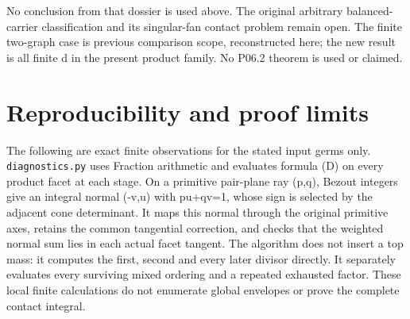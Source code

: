 \documentclass[
  11pt,
]{article}
\newenvironment{Shaded}{}{}
\newcommand{\ExtensionTok}[1]{#1}
\newcommand{\KeywordTok}[1]{\textcolor[rgb]{0.00,0.44,0.13}{\textbf{#1}}}
\newcommand{\NormalTok}[1]{#1}
\newcommand{\SpecialCharTok}[1]{\textcolor[rgb]{0.25,0.44,0.63}{#1}}
\newcommand{\SpecialStringTok}[1]{\textcolor[rgb]{0.73,0.40,0.53}{#1}}
\begin{document}
\begin{Shaded}
\end{Shaded}

No conclusion from that dossier is used above. The original arbitrary
balanced-carrier classification and its singular-fan contact problem
remain open. The finite two-graph case is previous comparison scope,
reconstructed here; the new result is all finite d in the present
product family. No P06.2 theorem is used or claimed.

\section{Reproducibility and proof
limits}\label{reproducibility-and-proof-limits}

The following are exact finite observations for the stated input germs
only. \texttt{diagnostics.py} uses Fraction arithmetic and evaluates
formula (D) on every product facet at each stage. On a primitive
pair-plane ray (p,q), Bezout integers give an integral normal (-v,u)
with pu+qv=1, whose sign is selected by the adjacent cone determinant.
It maps this normal through the original primitive axes, retains the
common tangential correction, and checks that the weighted normal sum
lies in each actual facet tangent. The algorithm does not insert a top
mass: it computes the first, second and every later divisor directly. It
separately evaluates every surviving mixed ordering and a repeated
exhausted factor. These local finite calculations do not enumerate
global envelopes or prove the complete contact integral.
\end{document}
